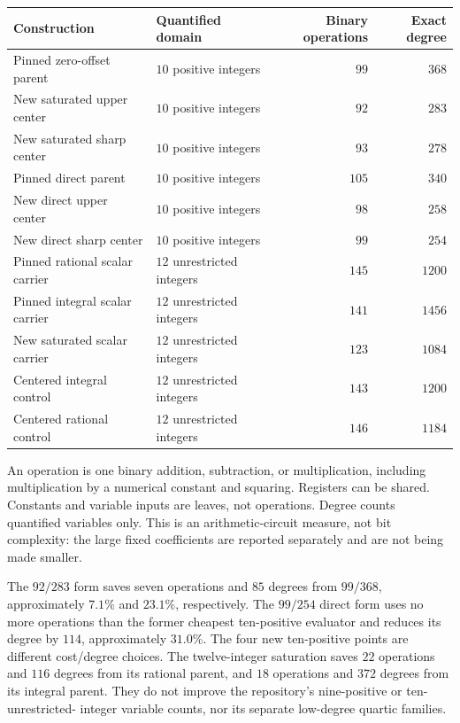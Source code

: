 \documentclass[11pt,letterpaper]{article}
\theoremstyle{remark}\newtheorem{remark}[theorem]{Remark}
\begin{document}
\begin{center}
\begin{tabular}{@{}llrr@{}}\toprule
Construction & Quantified domain & Binary operations & Exact degree\\\midrule
Pinned zero-offset parent & $10$ positive integers & $99$ & $368$\\
New saturated upper center & $10$ positive integers & $92$ & $283$\\
New saturated sharp center & $10$ positive integers & $93$ & $278$\\
Pinned direct parent & $10$ positive integers & $105$ & $340$\\
New direct upper center & $10$ positive integers & $98$ & $258$\\
New direct sharp center & $10$ positive integers & $99$ & $254$\\\midrule
Pinned rational scalar carrier & $12$ unrestricted integers & $145$ & $1200$\\
Pinned integral scalar carrier & $12$ unrestricted integers & $141$ & $1456$\\
New saturated scalar carrier & $12$ unrestricted integers & $123$ & $1084$\\
Centered integral control & $12$ unrestricted integers & $143$ & $1200$\\
Centered rational control & $12$ unrestricted integers & $146$ & $1184$\\\bottomrule
\end{tabular}
\end{center}

An operation is one binary addition, subtraction, or multiplication,
including multiplication by a numerical constant and squaring.  Registers
can be shared.  Constants and variable inputs are leaves, not operations.
Degree counts quantified variables only.  This is an arithmetic-circuit
measure, not bit complexity: the large fixed coefficients are reported
separately and are not being made smaller.

The $92/283$ form saves seven operations and $85$ degrees from $99/368$,
approximately $7.1\%$ and $23.1\%$, respectively.  The $99/254$ direct form
uses no more operations than the former cheapest ten-positive evaluator
and reduces its degree by $114$, approximately $31.0\%$.
The four new ten-positive points are different cost/degree choices.
The twelve-integer saturation saves $22$ operations and $116$ degrees
from its rational parent, and $18$ operations and $372$ degrees from
its integral parent.
They do not improve the repository's nine-positive or ten-unrestricted-
integer variable counts, nor its separate low-degree quartic families.
\end{document}
